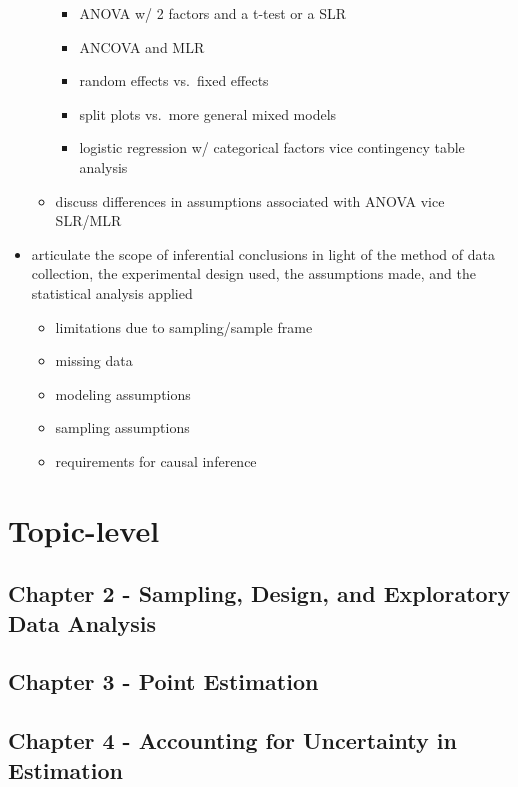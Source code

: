 \documentclass[]{book}
\providecommand{\tightlist}{%
  \setlength{\itemsep}{0pt}\setlength{\parskip}{0pt}}
\theoremstyle{definition}
\theoremstyle{definition}
\theoremstyle{definition}
\theoremstyle{remark}
\begin{document}
\begin{itemize}
\begin{itemize}
    \begin{itemize}
    \tightlist
    \item
      ANOVA w/ 2 factors and a t-test or a SLR
    \item
      ANCOVA and MLR
    \item
      random effects vs.~fixed effects
    \item
      split plots vs.~more general mixed models
    \item
      logistic regression w/ categorical factors vice contingency table
      analysis
    \end{itemize}
  \item
    discuss differences in assumptions associated with ANOVA vice
    SLR/MLR
  \end{itemize}
\item
  articulate the scope of inferential conclusions in light of the method
  of data collection, the experimental design used, the assumptions
  made, and the statistical analysis applied

  \begin{itemize}
  \tightlist
  \item
    limitations due to sampling/sample frame
  \item
    missing data
  \item
    modeling assumptions
  \item
    sampling assumptions
  \item
    requirements for causal inference
  \end{itemize}
\end{itemize}

\section{Topic-level}\label{topic-level}

\subsection{Chapter 2 - Sampling, Design, and Exploratory Data
Analysis}\label{chapter-2---sampling-design-and-exploratory-data-analysis}

\subsection{Chapter 3 - Point
Estimation}\label{chapter-3---point-estimation}

\subsection{Chapter 4 - Accounting for Uncertainty in
Estimation}\label{chapter-4---accounting-for-uncertainty-in-estimation}
\end{document}
